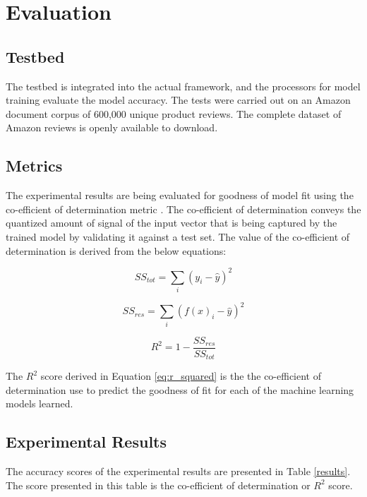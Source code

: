 \documentclass[conference]{IEEEtran}
\begin{document}
\vspace{5mm}

\section{Evaluation}

    \subsection{Testbed}
        The testbed is integrated into the actual framework, and the processors for model training evaluate the model accuracy.
        The tests were carried out on an Amazon document corpus of 600,000 unique product reviews.
        The complete dataset of Amazon reviews is openly available to download\cite{amazon_datasets}.

    \subsection{Metrics}
        The experimental results are being evaluated for goodness of model fit using the co-efficient of determination metric \cite{jaeger1990statistics}.
        The co-efficient of determination conveys the quantized amount of signal of the input vector that is being captured by the trained model by validating it against a test set. 
        The value of the co-efficient of determination is derived from the below equations:

        \begin{equation}
            \displaystyle SS_{tot} = \sum_{i} (y_i - \hat{y})^2
        \end{equation}

        \begin{equation}
            \displaystyle SS_{res} = \sum_{i} (f(x)_i - \hat{y})^2
        \end{equation}

        \begin{equation} \label{eq:r_squared}
            \displaystyle R^2 = 1 - \frac{SS_{res}}{SS_{tot}}
        \end{equation}

        The $R^2$ score derived in Equation \ref{eq:r_squared} is the the co-efficient of determination use to predict the goodness of fit for each of the machine learning models learned.


    \subsection{Experimental Results}
        The accuracy scores of the experimental results are presented in Table \ref{results}. The score presented in this table is the co-efficient of determination or $R^2$ score.
\end{document}
